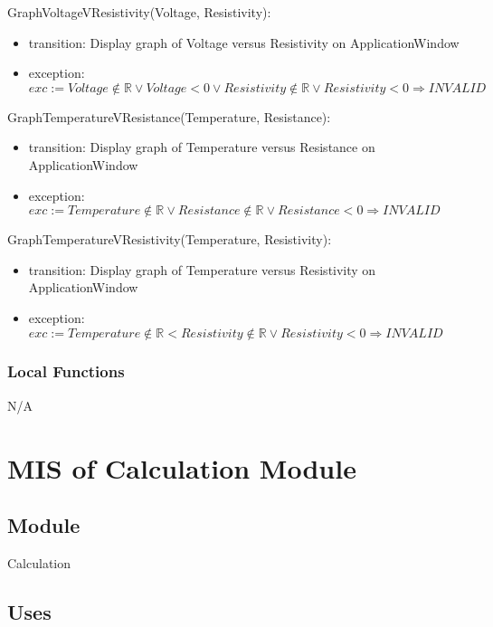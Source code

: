\documentclass[12pt, titlepage]{article}
\begin{document}
\noindent GraphVoltageVResistivity(Voltage, Resistivity):
\begin{itemize}
\item transition: Display graph of Voltage versus Resistivity on ApplicationWindow
\item exception: $exc:= Voltage \notin  \mathbb{R} \lor Voltage < 0 \lor  Resistivity \notin  \mathbb{R} \lor Resistivity< 0\Rightarrow INVALID$
\end{itemize}

\noindent GraphTemperatureVResistance(Temperature, Resistance):
\begin{itemize}
\item transition: Display graph of Temperature versus Resistance on ApplicationWindow
\item exception: $exc:= Temperature \notin  \mathbb{R} \lor  Resistance \notin  \mathbb{R} \lor Resistance < 0\Rightarrow INVALID$
\end{itemize}

\noindent GraphTemperatureVResistivity(Temperature, Resistivity):
\begin{itemize}
\item transition: Display graph of Temperature versus Resistivity on ApplicationWindow
\item exception: $exc:= Temperature \notin  \mathbb{R} <  Resistivity \notin  \mathbb{R} \lor Resistivity < 0\Rightarrow INVALID$
\end{itemize}

\subsubsection{Local Functions}

N/A

\newpage


\section{MIS of Calculation Module} \label{C} 

\subsection{Module}

Calculation

\subsection{Uses}
\end{document}
